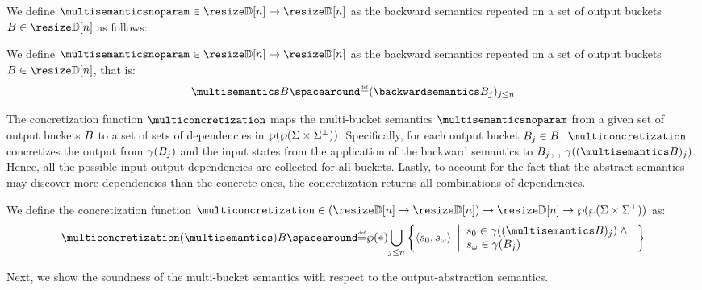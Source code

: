 We define
$\multisemanticsnoparam\in\multitype$ as the backward semantics repeated on a set of output buckets $\buckets\in\vectorbuckets$ as follows:

\begin{definition}
  We define
$\multisemanticsnoparam\in\multitype$ as the backward semantics repeated on a set of output buckets $\buckets\in\vectorbuckets$, that is:
\begin{align*}
\multisemantics\buckets \DefeQ (\backwardsemantics\bucket)_{j\le n}
\end{align*}
\end{definition}


The concretization function $\multiconcretization$ maps the multi-bucket semantics $\multisemanticsnoparam$ from a given set of output buckets $B$ to a set of sets of dependencies in $\wp(\wp(\Sigma\times\Sigma^\bot))$.
Specifically, for each output bucket ${B}_{j}\in B$, $\multiconcretization$ concretizes the output from $\gamma({B}_{j})$ and the input states from the application of the backward semantics to ${B}_{j}$, \ie, $\abstractdomainconcretization((\multisemantics\buckets)_j)$.
Hence, all the possible input-output dependencies are collected for all buckets.
Lastly, to account for the fact that the abstract semantics may discover more dependencies than the concrete ones, the concretization returns all combinations of dependencies.
\begin{definition}
  We define the concretization function $\multiconcretization\in(\multitype)\to\vectorbuckets\to\outputtype$ as:
\begin{gather*}
  \multiconcretization(\multisemantics)\buckets \DefeQ
  \setof*{\bigsetjoin_{j\le n} \bigsetdef{\inputoutputtuple{\defstate}}{\retrieveinput{\defstate}\in\abstractdomainconcretization((\multisemantics\buckets)_j) \land{} \\ \retrieveoutput{\defstate}\in\abstractdomainconcretization(\bucket)}}
\end{gather*}
\end{definition}

Next, we show the soundness of the multi-bucket semantics with respect to the output-abstraction semantics.


